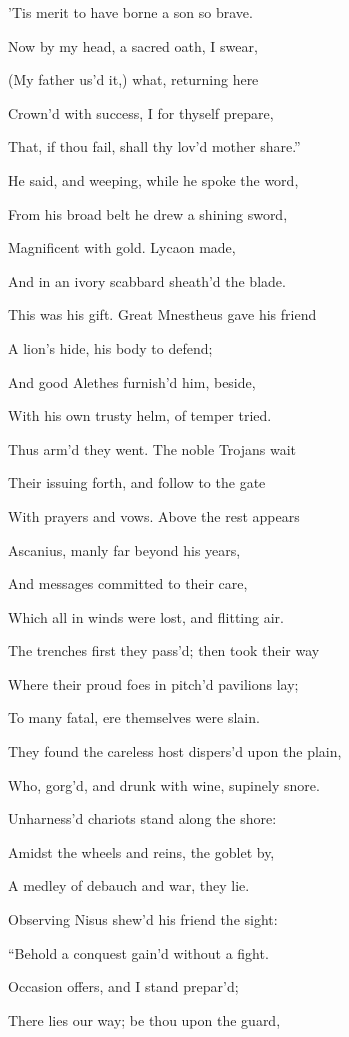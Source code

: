 ’Tis merit to have borne a son so brave.

Now by my head, a sacred oath, I swear,

(My father us’d it,) what, returning here

Crown’d with success, I for thyself prepare,

That, if thou fail, shall thy lov’d mother share.”

He said, and weeping, while he spoke the word,

From his broad belt he drew a shining sword,

Magnificent with gold. Lycaon made,

And in an ivory scabbard sheath’d the blade.

This was his gift. Great Mnestheus gave his friend

A lion’s hide, his body to defend;

And good Alethes furnish’d him, beside,

With his own trusty helm, of temper tried.

Thus arm’d they went. The noble Trojans wait

Their issuing forth, and follow to the gate

With prayers and vows. Above the rest appears

Ascanius, manly far beyond his years,

And messages committed to their care,

Which all in winds were lost, and flitting air.

The trenches first they pass’d; then took their way

Where their proud foes in pitch’d pavilions lay;

To many fatal, ere themselves were slain.

They found the careless host dispers’d upon the plain,

Who, gorg’d, and drunk with wine, supinely snore.

Unharness’d chariots stand along the shore:

Amidst the wheels and reins, the goblet by,

A medley of debauch and war, they lie.

Observing Nisus shew’d his friend the sight:

“Behold a conquest gain’d without a fight.

Occasion offers, and I stand prepar’d;

There lies our way; be thou upon the guard,

